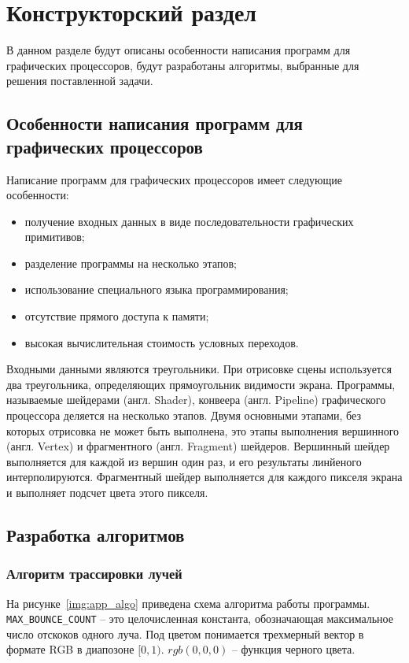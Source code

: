 \chapter{Конструкторский раздел}

В данном разделе будут описаны особенности написания программ для графических процессоров, 
будут разработаны алгоритмы, выбранные для решения поставленной задачи.

\section{Особенности написания программ для графических процессоров}

Написание программ для графических процессоров имеет следующие особенности:
\begin{itemize}
    \item получение входных данных в виде последовательности графических примитивов;
    \item разделение программы на несколько этапов;
    \item использование специального языка программирования;
    \item отсутствие прямого доступа к памяти;
    \item высокая вычислительная стоимость условных переходов.
\end{itemize}

Входными данными являются треугольники. При отрисовке сцены используется два треугольника,
определяющих прямоугольник видимости экрана.
Программы, называемые шейдерами (англ. Shader), конвеера (англ. Pipeline) 
графического процессора деляется на несколько этапов. Двумя основными этапами, 
без которых отрисовка не может быть выполнена, это этапы выполнения вершинного (англ. Vertex) и 
фрагментного (англ. Fragment) шейдеров. Вершинный шейдер выполняется для каждой из вершин один
раз, и его результаты линйеного интерполируются. Фрагментный шейдер
выполняется для каждого пикселя экрана и выполняет подсчет цвета этого пикселя.

\section{Разработка алгоритмов}

\subsection{Алгоритм трассировки лучей}

На рисунке~\ref{img:app_algo} приведена схема алгоритма работы программы.
\verb|MAX_BOUNCE_COUNT| -- это целочисленная константа, обозначающая максимальное число
отскоков одного луча. Под цветом понимается
трехмерный вектор в формате RGB в диапозоне $[0, 1)$. $rgb(0,0,0)$ -- функция черного цвета. 

